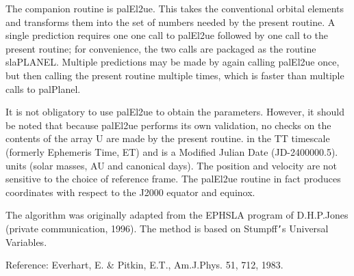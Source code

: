 \documentclass[twoside,11pt]{article}
\renewcommand{\_}{\texttt{\symbol{95}}}
\newcommand{\sstitem}{\item}
\newcommand{\sstitem}{\item}
\begin{document}
{{{         \sstitem
         The companion routine is palEl2ue.  This takes the conventional
           orbital elements and transforms them into the set of numbers
           needed by the present routine.  A single prediction requires one
           one call to palEl2ue followed by one call to the present routine;
           for convenience, the two calls are packaged as the routine
           sla\_PLANEL.  Multiple predictions may be made by again
           calling palEl2ue once, but then calling the present routine
           multiple times, which is faster than multiple calls to palPlanel.

         \sstitem
         It is not obligatory to use palEl2ue to obtain the parameters.
           However, it should be noted that because palEl2ue performs its
           own validation, no checks on the contents of the array U are made
           by the present routine.
           in the TT timescale (formerly Ephemeris Time, ET) and is a
           Modified Julian Date (JD-2400000.5).
           units (solar masses, AU and canonical days).  The position and
           velocity are not sensitive to the choice of reference frame.  The
           palEl2ue routine in fact produces coordinates with respect to the
           J2000 equator and equinox.

         \sstitem
         The algorithm was originally adapted from the EPHSLA program of
           D.H.P.Jones (private communication, 1996).  The method is based
           on Stumpff{\tt '}s Universal Variables.

         \sstitem
         Reference:  Everhart, E. \& Pitkin, E.T., Am.J.Phys. 51, 712, 1983.
      }
   }
}


\end{document}

